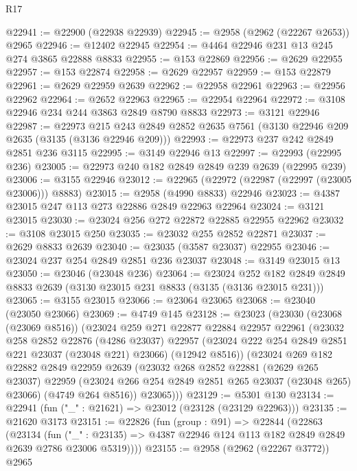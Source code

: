 \begin{lexlean}{R17}
\begin{coremodule}
@22941 := @22900 (@22938 @22939)
@22945 := @2958 (@2962 (@22267 @2653)) @2965
@22946 := @12402 @22945
@22954 := @4464 @22946 @231 @13 @245 @274 @3865 @22888 @8833
@22955 := @153 @22869
@22956 := @2629 @22955
@22957 := @153 @22874
@22958 := @2629 @22957
@22959 := @153 @22879
@22961 := @2629 @22959 @2639
@22962 := @22958 @22961
@22963 := @22956 @22962
@22964 := @2652 @22963
@22965 := @22954 @22964
@22972 := @3108 @22946 @234 @244 @3863 @2849 @8790 @8833
@22973 := @3121 @22946
@22987 := @22973
    @215
    @243
    @2849
    @2852
    @2635
    @7561
    (@3130 @22946 @209 @2635 (@3135 (@3136 @22946 @209)))
@22993 := @22973 @237 @242 @2849 @2851 @236 @3115
@22995 := @3149 @22946 @13
@22997 := @22993 (@22995 @236)
@23005 := @22973 @240 @182 @2849 @2849 @239 @2639 (@22995 @239)
@23006 := @3155 @22946
@23012 := @22965 (@22972 (@22987 (@22997 (@23005 @23006))) @8883)
@23015 := @2958 (@4990 @8833) @22946
@23023 := @4387 @23015 @247 @113 @273 @22886 @2849 @22963 @22964
@23024 := @3121 @23015
@23030 := @23024 @256 @272 @22872 @22885 @22955 @22962
@23032 := @3108 @23015 @250
@23035 := @23032 @255 @2852 @22871
@23037 := @2629 @8833 @2639
@23040 := @23035 (@3587 @23037) @22955
@23046 := @23024 @237 @254 @2849 @2851 @236 @23037
@23048 := @3149 @23015 @13
@23050 := @23046 (@23048 @236)
@23064 := @23024
    @252
    @182
    @2849
    @2849
    @8833
    @2639
    (@3130 @23015 @231 @8833 (@3135 (@3136 @23015 @231)))
@23065 := @3155 @23015
@23066 := @23064 @23065
@23068 := @23040 (@23050 @23066)
@23069 := @4749 @145
@23128 := @23023
    (@23030
      (@23068 (@23069 @8516))
      (@23024
        @259
        @271
        @22877
        @22884
        @22957
        @22961
        (@23032
          @258
          @2852
          @22876
          (@4286 @23037)
          @22957
          (@23024 @222 @254 @2849 @2851 @221 @23037 (@23048 @221) @23066)
          (@12942 @8516))
        (@23024
          @269
          @182
          @22882
          @2849
          @22959
          @2639
          (@23032
            @268
            @2852
            @22881
            (@2629 @265 @23037)
            @22959
            (@23024 @266 @254 @2849 @2851 @265 @23037 (@23048 @265) @23066)
            (@4749 @264 @8516))
          @23065)))
@23129 := @5301 @130
@23134 := @22941 (fun ("_" : @21621) => @23012 (@23128 (@23129 @22963)))
@23135 := @21620 @3173
@23151 := @22826
    (fun (group : @91) =>
    @22844
      (@22863
        (@23134
          (fun ("_" : @23135) =>
          @4387 @22946 @124 @113 @182 @2849 @2849 @2639 @2786 @23006 @5319))))
@23155 := @2958 (@2962 (@22267 @3772)) @2965

\end{coremodule}
\end{lexlean}
